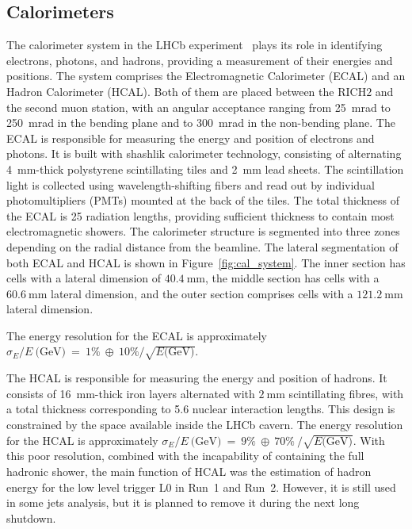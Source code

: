 \subsection{Calorimeters}
\sloppy
The calorimeter system in the LHCb experiment~\cite{LHCb:2000vji} plays its role in identifying electrons, photons, and hadrons, providing a measurement of their energies and positions. The system comprises the Electromagnetic Calorimeter (ECAL) and an  Hadron Calorimeter (HCAL). Both of them are  placed between the RICH$2$ and the second muon station, with an angular acceptance ranging from \SI{25}{\milli\radian} to \SI{250}{\milli\radian} in the bending plane and to \SI{300}{\milli\radian} in the non-bending plane. 
The ECAL is responsible for measuring the energy and position of electrons and photons. It is built with shashlik calorimeter technology\cite{Badier:293003}, consisting of alternating \SI{4}{\milli\meter}-thick polystyrene scintillating tiles and \SI{2}{\milli\meter} lead sheets. The scintillation light is collected using wavelength-shifting fibers and read out by individual photomultipliers (PMTs) mounted at the back of the tiles. The total thickness of the ECAL is 25 radiation lengths, providing sufficient thickness to contain most electromagnetic showers. The calorimeter structure is segmented into three zones depending on the radial distance from the beamline. The lateral segmentation of both ECAL and HCAL is shown in Figure~\ref{fig:cal_system}. The inner section has cells with a lateral dimension of $\SI{40.4}{\milli\meter}$, the middle section has cells with a $\SI{60.6}{\milli\meter}$ lateral dimension, and the outer section comprises cells with a $\SI{121.2}{\milli\meter}$ lateral dimension. 


The energy resolution for the ECAL is approximately 
 $\sigma_E/E~\text{(GeV)}~=~1\%~\oplus~10\%/\sqrt{E\text{(GeV)}}$.

\sloppy
The HCAL is responsible for measuring the energy and position of hadrons. It consists of \SI{16}{\milli\meter}-thick iron layers alternated with $\SI{2}{\milli\meter}$ scintillating fibres, with a total thickness corresponding to 5.6 nuclear interaction lengths. This design is constrained by the space available inside the LHCb cavern. The energy resolution for the HCAL is approximately $\sigma_E/E~\text{(GeV)}~=~9\%~\oplus~70\%~/\sqrt{E\text{(GeV)}}$. With this poor resolution, combined with the incapability of containing the full hadronic shower, the main function of HCAL was the estimation of hadron energy for the low level trigger L$0$ in Run~1 and Run~2. However, it is still used in some jets analysis, but it is planned to remove it during the next long shutdown.


